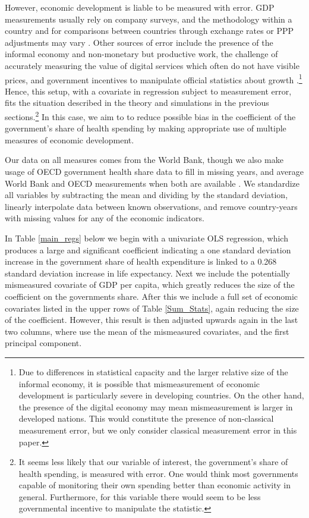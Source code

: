 \documentclass[10pt]{article}
\begin{document}
        However, economic development is liable to be measured with error. GDP measurements usually rely on company surveys, and the methodology within a country and for comparisons between countries through exchange rates or PPP adjustments may vary \citep{grishin_main_2019}. Other sources of error include the presence of the informal economy and non-monetary but productive work, the challenge of accurately measuring the value of digital services which often do not have visible prices, and government incentives to manipulate official statistics about growth \citep{charmes_informal_2012,ahmad_can_2017,nakamura_are_2016}.\footnote{Due to differences in statistical capacity and the larger relative size of the informal economy, it is possible that mismeasurement of economic development is particularly severe in developing countries. On the other hand, the presence of the digital economy may mean mismeasurement is larger in developed nations. This would constitute the presence of non-classical measurement error, but we only consider classical measurement error in this paper.} Hence, this setup, with a covariate in regression subject to measurement error, fits the situation described in the theory and simulations in the previous sections.\footnote{It seems less likely that our variable of interest, the government's share of health spending, is measured with error. One would think most governments capable of monitoring their own spending better than economic activity in general. Furthermore, for this variable there would seem to be less governmental incentive to manipulate the statistic.} In this case, we aim to to reduce possible bias in the coefficient of the government's share of health spending by making appropriate use of multiple measures of economic development.

        Our data on all measures comes from the World Bank, though we also make usage of OECD government health share data to fill in missing years, and average World Bank and OECD measurements when both are available \citep{the_world_bank_indicators_2021,oecd_oecd_2021}. We standardize all variables by subtracting the mean and dividing by the standard deviation, linearly interpolate data between known observations, and remove country-years with missing values for any of the economic indicators.

        In Table \ref{main_regs} below we begin with a univariate OLS regression, which produces a large and significant coefficient indicating a one standard deviation increase in the government share of health expenditure is linked to a 0.268 standard deviation increase in life expectancy. Next we include the potentially mismeasured covariate of GDP per capita, which greatly reduces the size of the coefficient on the governments share. After this we include a full set of economic covariates listed in the upper rows of Table \ref{Sum_Stats}, again reducing the size of the coefficient. However, this result is then adjusted upwards again in the last two columns, where use the mean of the mismeasured covariates, and the first principal component.
\end{document}
